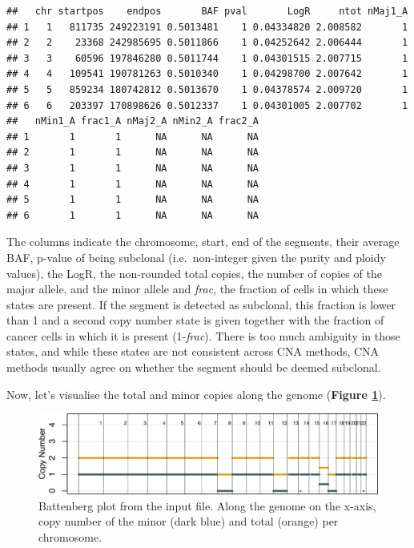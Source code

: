 \documentclass[]{article}
\begin{document}
\begin{verbatim}
##   chr startpos    endpos       BAF pval       LogR     ntot nMaj1_A
## 1   1   811735 249223191 0.5013481    1 0.04334820 2.008582       1
## 2   2    23368 242985695 0.5011866    1 0.04252642 2.006444       1
## 3   3    60596 197846280 0.5011744    1 0.04301515 2.007715       1
## 4   4   109541 190781263 0.5010340    1 0.04298700 2.007642       1
## 5   5   859234 180742812 0.5013670    1 0.04378574 2.009720       1
## 6   6   203397 170898626 0.5012337    1 0.04301005 2.007702       1
##   nMin1_A frac1_A nMaj2_A nMin2_A frac2_A
## 1       1       1      NA      NA      NA
## 2       1       1      NA      NA      NA
## 3       1       1      NA      NA      NA
## 4       1       1      NA      NA      NA
## 5       1       1      NA      NA      NA
## 6       1       1      NA      NA      NA
\end{verbatim}

The columns indicate the chromosome, start, end of the segments, their
average BAF, p-value of being subclonal (i.e.~non-integer given the
purity and ploidy values), the LogR, the non-rounded total copies, the
number of copies of the major allele, and the minor allele and
\emph{frac}, the fraction of cells in which these states are present. If
the segment is detected as subclonal, this fraction is lower than 1 and
a second copy number state is given together with the fraction of cancer
cells in which it is present (1-\emph{frac}). There is too much
ambiguity in those states, and while these states are not consistent
across CNA methods, CNA methods usually agree on whether the segment
should be deemed subclonal.

Now, let's visualise the total and minor copies along the genome
(\textbf{Figure \ref{fig:fig2}}).

\begin{figure}

{\centering \includegraphics{src_guide_files/figure-latex/fig2-1} 

}

\caption{\label{fig2} Battenberg plot from the input file. Along the genome on the x-axis, copy number of the minor (dark blue) and total (orange) per chromosome. }\label{fig:fig2}
\end{figure}
\end{document}
